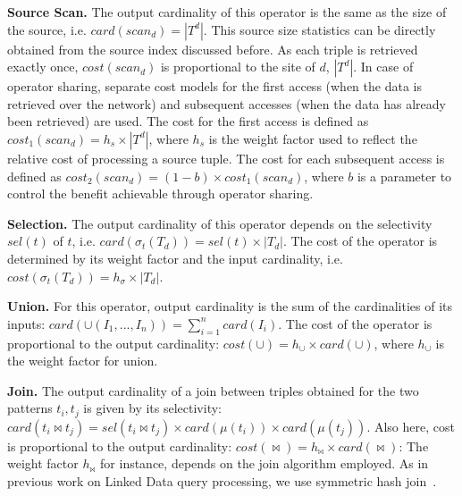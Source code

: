 \textbf{Source Scan.} The output cardinality of this operator is the same as the size of the source, i.e. $card(scan_d) = |T^d|$. 
This source size statistics can be directly obtained from the source index discussed before. As each triple is retrieved exactly once, $cost(scan_d)$ is proportional to the site of $d$, $|T^d|$. 
In case of operator sharing, separate cost
models for the first access (when the data is retrieved over the
network) and subsequent accesses (when the data has already been
retrieved) are used. The cost for the first access is defined as
$cost_1(scan_d) = h_s \times |T^d|$, where $h_s$ is the weight factor
used to reflect the relative cost of processing a source tuple. The cost for each subsequent access is
defined as $cost_2(scan_d) = (1 - b) \times cost_1(scan_d)$, where $b$
is a parameter to control the benefit achievable through operator sharing.

\textbf{Selection.} The output cardinality
of this operator depends on the selectivity $sel(t)$ of $t$, i.e. $card(\sigma_t(T_d)) = sel(t) \times |T_d|$. The cost of the 
operator is determined by its weight factor and the input cardinality, i.e. $cost(\sigma_t(T_d))=h_\sigma \times |T_d|$.

\textbf{Union.} For this operator, output cardinality is the sum of the cardinalities of its inputs:
$card(\cup(I_1,...,I_n)) = \sum_{i=1}^n card(I_i)$. The cost of the
operator is proportional to the output cardinality: $cost(\cup) =
h_\cup \times card(\cup)$, where $h_\cup$ is the weight factor for union. 

\textbf{Join.} The output cardinality of a join between triples obtained for the two patterns $t_i,t_j$ is given by its selectivity: $card(t_i \Join t_j) =
sel(t_i \Join t_j) \times card(\mu(t_i)) \times card(\mu(t_j))$. 
Also here, cost is proportional to the output cardinality: $cost(\Join) =
h_\Join \times card(\Join)$: The weight factor $h_\Join$ for instance, depends on the
join algorithm employed. As in previous work on Linked Data query processing, we use symmetric hash join~\cite{ladwig_linked_2010,sihjoin_2011}. 




